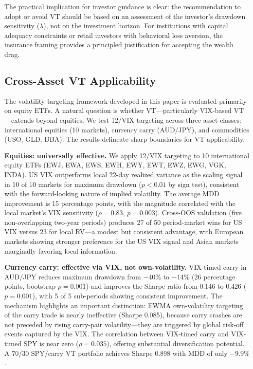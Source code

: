 The practical implication for investor guidance is clear: the recommendation to adopt or avoid VT should be based on an assessment of the investor's drawdown sensitivity ($\lambda$), not on the investment horizon. For institutions with capital adequacy constraints or retail investors with behavioral loss aversion, the insurance framing provides a principled justification for accepting the wealth drag.



\subsection{Cross-Asset VT Applicability}
\label{sec:cross_asset_vt}

The volatility targeting framework developed in this paper is evaluated primarily on equity ETFs. A natural question is whether VT---particularly VIX-based VT---extends beyond equities. We test 12/VIX targeting across three asset classes: international equities (10 markets), currency carry (AUD/JPY), and commodities (USO, GLD, DBA). The results delineate sharp boundaries for VT applicability.

\textbf{Equities: universally effective.} We apply 12/VIX targeting to 10 international equity ETFs (EWJ, EWA, EWS, EWH, EWY, EWT, EWZ, EWG, VGK, INDA). US VIX outperforms local 22-day realized variance as the scaling signal in 10 of 10 markets for maximum drawdown ($p < 0.01$ by sign test), consistent with the forward-looking nature of implied volatility. The average MDD improvement is 15 percentage points, with the magnitude correlated with the local market's VIX sensitivity ($\rho = 0.83$, $p = 0.003$). Cross-OOS validation (five non-overlapping two-year periods) produces 27 of 50 period-market wins for US VIX versus 23 for local RV---a modest but consistent advantage, with European markets showing stronger preference for the US VIX signal and Asian markets marginally favoring local information.

\textbf{Currency carry: effective via VIX, not own-volatility.} VIX-timed carry in AUD/JPY reduces maximum drawdown from $-40\%$ to $-14\%$ (26 percentage points, bootstrap $p = 0.001$) and improves the Sharpe ratio from 0.146 to 0.426 ($p = 0.001$), with 5 of 5 sub-periods showing consistent improvement. The mechanism highlights an important distinction: EWMA own-volatility targeting of the carry trade is nearly ineffective (Sharpe 0.085), because carry crashes are not preceded by rising carry-pair volatility---they are triggered by global risk-off events captured by the VIX. The correlation between VIX-timed carry and VIX-timed SPY is near zero ($\rho = 0.035$), offering substantial diversification potential. A 70/30 SPY/carry VT portfolio achieves Sharpe 0.898 with MDD of only $-9.9\%$.

